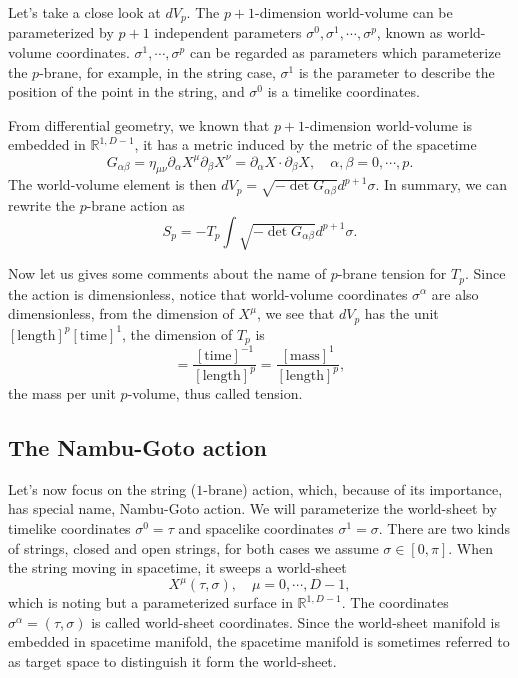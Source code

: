 \documentclass[graybox,envcountchap,sectrefs]{svmono}
\begin{document}
Let's take a close look at $dV_p$. The $p+1$-dimension world-volume can be parameterized by $p+1$ independent parameters $\sigma^0,\sigma^1,\cdots, \sigma^p$, known as world-volume coordinates. $\sigma^1,\cdots,\sigma^p$ can be regarded as parameters which parameterize the $p$-brane, for example, in the string case, $\sigma^1$ is the parameter to describe the position of the point in the string, and $\sigma^0$ is a timelike coordinates.

From differential geometry, we known that $p+1$-dimension world-volume is embedded in $\mathbb{R}^{1,D-1}$, it has a metric induced by the metric of the spacetime
\begin{equation}
G_{\alpha\beta}=\eta_{\mu\nu}\partial_{\alpha}X^{\mu}\partial_{\beta}X^{\nu}=\partial_{\alpha}X \cdot\partial_{\beta}X,\quad \alpha,\beta=0,\cdots,p.
\end{equation}
The world-volume element is then $dV_p=\sqrt{-\det G_{\alpha\beta}}d^{p+1}\sigma$. In summary, we can rewrite the $p$-brane action as
\begin{equation}
\boxed{S_p=-T_p\int \sqrt{-\det G_{\alpha\beta}}d^{p+1}\sigma.}
\end{equation}

Now let us gives some comments about  the name of $p$-brane tension for $T_p$. Since the action is dimensionless, notice that world-volume coordinates $\sigma^{\alpha}$ are also dimensionless, from the dimension of $X^{\mu}$, we see that 
$dV_p$ has the unit $[\text{length}]^{p}[\text{time}]^1$, the dimension of $T_p$ is
\begin{equation}
[T_p]=\frac{[\text{time}]^{-1}}{[\text{length}]^{p}}=\frac{[\text{mass}]^1}{[\text{length}]^{p}},
\end{equation}
the mass per unit $p$-volume, thus called tension.



\subsection{The Nambu-Goto action}




Let's now focus on the string ($1$-brane) action, which, because of its importance, has special name, Nambu-Goto action. We will parameterize the world-sheet by timelike coordinates $\sigma^0=\tau$ and spacelike coordinates $\sigma^1=\sigma$. There are two kinds of strings, closed and open strings, for both cases we assume $\sigma\in [0,\pi]$. When the string moving in spacetime, it sweeps a world-sheet
\begin{equation}
X^{\mu}(\tau,\sigma),\quad \mu=0,\cdots, D-1,
\end{equation}
which is noting but a parameterized surface in $\mathbb{R}^{1,D-1}$. The coordinates $\sigma^{\alpha}=(\tau,\sigma)$ is called world-sheet coordinates. Since the world-sheet manifold is embedded in spacetime manifold, the spacetime manifold is sometimes referred to as target space to distinguish it form the world-sheet.
\end{document}
